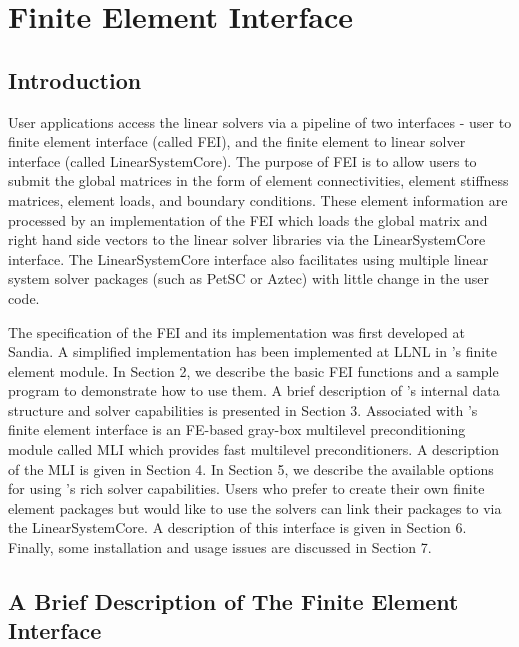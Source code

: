 \chapter{Finite Element Interface}
\label{chapter-FEI}

\section{Introduction}

User applications access the \hypre{} linear solvers via a pipeline of
two interfaces - user to finite element interface (called {\sf FEI}),
and the finite element to linear solver interface (called 
{\sf LinearSystemCore}). The purpose of {\sf FEI} is to allow users 
to submit the global matrices in the
form of element connectivities, element stiffness matrices, element
loads, and boundary conditions. These element information are processed
by an implementation of the {\sf FEI} which loads the global matrix and right
hand side vectors to the linear solver libraries via the 
{\sf LinearSystemCore} interface.
The {\sf LinearSystemCore} interface also facilitates using 
multiple linear system solver packages (such as PetSC or Aztec)
with little change in the user code.

The specification of the {\sf FEI} and its implementation was first
developed at Sandia. A simplified implementation has been implemented
at LLNL in \hypre{}'s finite element module. In Section 2, we describe the 
basic {\sf FEI} functions and a sample program to demonstrate how to
use them. A brief description of \hypre{}'s internal data structure and solver
capabilities is presented in Section 3.  Associated with \hypre{}'s finite
element interface is an FE-based gray-box multilevel preconditioning
module called {\sf MLI} which provides fast multilevel preconditioners.
A description of the {\sf MLI} is given in Section 4.
In Section 5, we describe the available options for using \hypre{}'s
rich solver capabilities. Users who prefer to create their own finite
element packages but would like to use the \hypre{} solvers can link their
packages to \hypre{} via the {\sf LinearSystemCore}. A description
of this interface is given in Section 6.  Finally, some installation 
and usage issues are discussed in Section 7.

\section{A Brief Description of The Finite Element Interface}

